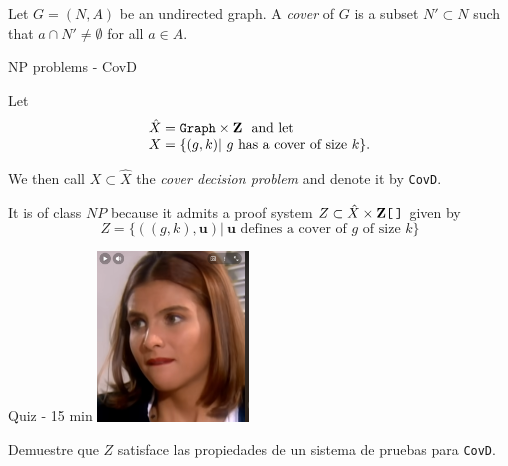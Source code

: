 %

\begin{frame}
	\begin{defn}
		Let $G= (N, A)$ be an undirected graph. A \emph{cover} of $G$ is a
		subset $N' \subset N$ such that $a \cap N' \neq \emptyset$ for all
		$a \in A$.
	\end{defn}
\end{frame}

%

\begin{frame}{NP problems - CovD}
	\begin{defn}
		Let
		\[
			\begin{array}{l}
				\hat{X}= \mathtt{Graph} \times \mathbf{Z}\ \mbox{ and let}\\
				X=
				\{
					(g, k) |\ \mbox{$g$ has a cover of size $k$}
				\}. 
			\end{array}
		\]

		We then call
		\(
			X \subset \hat{X}
		\)
		the \emph{cover decision problem} and denote it by \texttt{CovD}.
	\end{defn}

	\bigskip
	It is of class $NP$ because it admits a proof system
	\(
		Z \subset \hat{X} \times \mathbf{Z}\texttt{[\,]}
	\)
	given by
	\[
		Z=
		\{
			((g,k), \mathbf{u}) |\ 
			\mbox{$\mathbf{u}$ defines a cover of $g$ of size $k$}
		\}
	\]
\end{frame}

%

\begin{frame}{Quiz - 15 min}
	\centering
	\includegraphics[width= 0.3\textwidth]{marcela.png}

	\bigskip

	\pause
	
	\raggedright
	Demuestre que $Z$ satisface las propiedades de un sistema de pruebas para
	\texttt{CovD}.
\end{frame}

%

